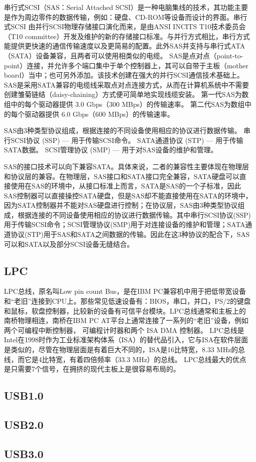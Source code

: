 串行式SCSI（SAS：Serial Attached SCSI）是一种电脑集线的技术，其功能主要是作为周边零件的数据传输，例如：硬盘、CD-ROM等设备而设计的界面。串行式SCSI 由并行SCSI物理存储接口演化而来，是由ANSI INCITS T10技术委员会（T10 committee）开发及维护的新的存储接口标准。与并行方式相比，串行方式能提供更快速的通信传输速度以及更简易的配置。此外SAS并支持与串行式ATA（SATA）设备兼容，且两者可以使用相类似的电缆。
SAS是点对点（point-to-point）连接，并允许多个端口集中于单个控制器上，其可以自带于主板（mother board）当中；也可另外添加。该技术创建在强大的并行SCSI通信技术基础上。SAS是采用SATA兼容的电缆线采取点对点连接方式，从而在计算机系统中不需要创建雏菊链结（daisy-chaining）方式便可简单地实现线缆安装。
第一代SAS为数组中的每个驱动器提供 3.0 Gbps（300 MBps）的传输速率。
第二代SAS为数组中的每个驱动器提供 6.0 Gbps（600 MBps）的传输速率。

SAS由3种类型协议组成，根据连接的不同设备使用相应的协议进行数据传输。
串行SCSI协议 (SSP) — 用于传输SCSI命令。
SATA通道协议 (STP) — 用于传输SATA数据。
SCSI管理协议 (SMP) — 用于对SAS设备的维护和管理。

SAS的接口技术可以向下兼容SATA。具体来说，二者的兼容性主要体现在物理层和协议层的兼容。在物理层，SAS接口和SATA接口完全兼容，SATA硬盘可以直接使用在SAS的环境中，从接口标准上而言，SATA是SAS的一个子标准，因此SAS控制器可以直接操控SATA硬盘，但是SAS却不能直接使用在SATA的环境中，因为SATA控制器并不能对SAS硬盘进行控制；在协议层，SAS由3种类型协议组成，根据连接的不同设备使用相应的协议进行数据传输。其中串行SCSI协议(SSP)用于传输SCSI命令；SCSI管理协议(SMP)用于对连接设备的维护和管理；SATA通道协议(STP)用于SAS和SATA之间数据的传输。因此在这3种协议的配合下，SAS可以和SATA以及部分SCSI设备无缝结合。



\subsection{LPC}
LPC总线，原名叫Low pin count Bus，是在IBM PC兼容机中用于把低带宽设备和“老旧”连接到CPU上。那些常见低速设备有：BIOS，串口，并口，PS/2的键盘和鼠标，软盘控制器，比较新的设备有可信平台模块。LPC总线通常和主板上的南桥物理相连，南桥在IBM PC AT平台上通常连接了一系列的“老旧”设备，例如两个可编程中断控制器， 可编程计时器和两个 ISA DMA 控制器。 LPC总线是Intel在1998时作为工业标准架构体系（ISA）的替代品引入，它与ISA在软件层面是类似的，尽管在物理层面是有着巨大不同的，ISA是16比特宽，8.33 MHz的总线，而它是4比特宽，有着四倍频率（33.3 MHz）的总线。 LPC总线最大的优点是只需要7个信号，在拥挤的现代主板上是很容易布局的。





\subsection{USB1.0}
\subsection{USB2.0}
\subsection{USB3.0}





